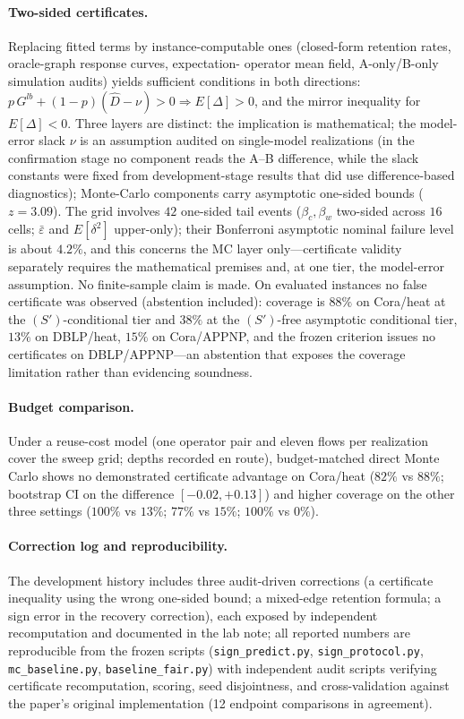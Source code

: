 \paragraph{Two-sided certificates.}
Replacing fitted terms by instance-computable ones (closed-form
retention rates, oracle-graph response curves, expectation-
operator mean field, A-only/B-only simulation audits) yields
sufficient conditions in both directions:
$p\,G^{lb}+(1-p)(\hat D-\nu)>0\Rightarrow E[\Delta]>0$, and the
mirror inequality for $E[\Delta]<0$. Three layers are distinct:
the implication is mathematical; the model-error slack $\nu$ is
an assumption audited on single-model realizations (in the
confirmation stage no component reads the A--B difference, while
the slack constants were fixed from development-stage results
that did use difference-based diagnostics); Monte-Carlo
components carry asymptotic one-sided bounds ($z=3.09$). The grid
involves $42$ one-sided tail events ($\beta_c,\beta_w$
two-sided across $16$ cells; $\bar\varepsilon$ and $E[\delta^2]$
upper-only); their Bonferroni asymptotic nominal failure level is
about $4.2\%$, and this concerns the MC layer only---certificate
validity separately requires the mathematical premises and, at
one tier, the model-error assumption. No finite-sample claim is
made. On evaluated instances no false certificate was observed
(abstention included): coverage is $88\%$ on Cora/heat at the
$(S')$-conditional tier and $38\%$ at the $(S')$-free asymptotic
conditional tier, $13\%$ on DBLP/heat, $15\%$ on Cora/APPNP, and
the frozen criterion issues no certificates on DBLP/APPNP---an
abstention that exposes the coverage limitation rather than
evidencing soundness.

\paragraph{Budget comparison.}
Under a reuse-cost model (one operator pair and eleven flows per
realization cover the sweep grid; depths recorded en route),
budget-matched direct Monte Carlo shows no demonstrated
certificate advantage on Cora/heat ($82\%$ vs $88\%$; bootstrap
CI on the difference $[-0.02,+0.13]$) and higher coverage on the
other three settings ($100\%$ vs $13\%$; $77\%$ vs $15\%$;
$100\%$ vs $0\%$).

\paragraph{Correction log and reproducibility.}
The development history includes three audit-driven corrections
(a certificate inequality using the wrong one-sided bound; a
mixed-edge retention formula; a sign error in the recovery
correction), each exposed by independent recomputation and
documented in the lab note; all reported numbers are reproducible
from the frozen scripts (\texttt{sign\_predict.py},
\texttt{sign\_protocol.py}, \texttt{mc\_baseline.py},
\texttt{baseline\_fair.py}) with independent audit scripts
verifying certificate recomputation, scoring, seed disjointness,
and cross-validation against the paper's original implementation
(12 endpoint comparisons in agreement).
